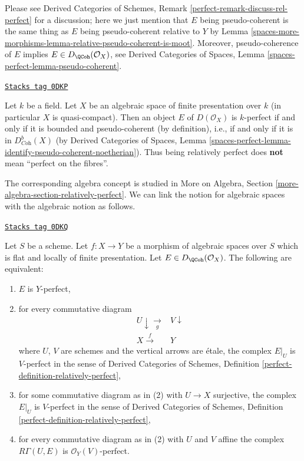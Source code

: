 Please see Derived Categories of Schemes,
Remark \ref{perfect-remark-discuss-rel-perfect} for a discussion;
here we just mention that $E$ being pseudo-coherent is the
same thing as $E$ being pseudo-coherent relative to $Y$ by
Lemma \ref{spaces-more-morphisms-lemma-relative-pseudo-coherent-is-moot}.
Moreover, pseudo-coherence of $E$ implies $E \in D_\QCoh(\mathcal{O}_X)$, see
Derived Categories of Spaces, Lemma
\ref{spaces-perfect-lemma-pseudo-coherent}.

\begin{example}
\label{spaces-more-morphisms-example-relatively-perfect-field}
\href{https://stacks.math.columbia.edu/tag/0DKP}{\texttt{Stacks tag 0DKP}}

Let $k$ be a field. Let $X$ be an algebraic space of finite presentation
over $k$ (in particular $X$ is quasi-compact). Then an object $E$ of
$D(\mathcal{O}_X)$ is $k$-perfect if and only if it is bounded and
pseudo-coherent (by definition), i.e., if and only if it is in
$D^b_{\textit{Coh}}(X)$ (by
Derived Categories of Spaces, Lemma
\ref{spaces-perfect-lemma-identify-pseudo-coherent-noetherian}).
Thus being relatively perfect does {\bf not} mean ``perfect on the fibres''.
\end{example}

The corresponding algebra concept is studied in
More on Algebra, Section \ref{more-algebra-section-relatively-perfect}.
We can link the notion for algebraic spaces with the
algebraic notion as follows.

\begin{lemma}
\label{spaces-more-morphisms-lemma-affine-locally-rel-perfect}
\href{https://stacks.math.columbia.edu/tag/0DKQ}{\texttt{Stacks tag 0DKQ}}

Let $S$ be a scheme. Let $f : X \to Y$ be a morphism of algebraic spaces
over $S$ which is flat and locally of finite presentation.
Let $E \in D_\QCoh(\mathcal{O}_X)$. The following are equivalent:
\begin{enumerate}
\item $E$ is $Y$-perfect,
\item for every commutative diagram
$$
\begin{array}{cc}U \downarrow\underset{g}{\longrightarrow} & V \downarrow \\ X \overset{f}{\longrightarrow} & Y\end{array}
$$
where $U$, $V$ are schemes and the vertical arrows are \'etale, the complex
$E|_U$ is $V$-perfect in the sense of Derived Categories of Schemes,
Definition \ref{perfect-definition-relatively-perfect},
\item for some commutative diagram as in (2) with $U \to X$
surjective, the complex $E|_U$ is $V$-perfect in the sense of
Derived Categories of Schemes,
Definition \ref{perfect-definition-relatively-perfect},
\item for every commutative diagram as in (2) with $U$ and $V$
affine the complex $R\Gamma(U, E)$ is $\mathcal{O}_Y(V)$-perfect.
\end{enumerate}
\end{lemma}

